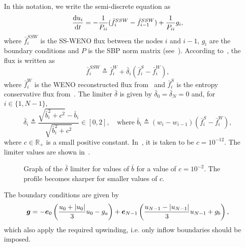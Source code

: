\documentclass{scrartcl}
\begin{document}
In this notation, we write the semi-discrete equation as
\[
\dfrac{\mathrm{d} u_i}{\mathrm{d} t} =
-\frac{1}{P_{ii}} (\bar{f}^{SSW}_i - \bar{f}^{SSW}_{i - 1})
+ \frac{1}{P_{ii}} g_i,
\]
where $\bar{f}^{SSW}_i$ is the SS-WENO flux between the nodes $i$ and $i - 1$,
$g_i$ are the boundary conditions and $P$ is the SBP norm matrix
(see~\cite[Appendix A]{Fisher2013}). According to~\cite{Fisher2013}, the
flux is written as
\begin{equation} \label{eq:ssweno:flux}
\bar{f}_i^{SSW} \triangleq \bar{f}^{W}_i + \bar{\delta}_i (\bar{f}^{S}_i - \bar{f}^W_i),
\end{equation}
where $\bar{f}^W_i$ is the WENO reconstructed flux from~ and
$\bar{f}^S_i$ is the entropy conservative flux from~. The
limiter $\bar{\delta}$ is given by $\bar{\delta}_0 = \bar{\delta}_N = 0$ and,
for $i \in \{1, N - 1\}$,
\begin{equation} \label{eq::ssweno:limiter}
\bar{\delta}_i \triangleq
    \frac{\sqrt{\bar{b}_i^2 + c^2} - \bar{b}_i}{\sqrt{\bar{b}_i^2 + c^2}}
    \in [0, 2],
    \quad \text{where }
    \bar{b}_i \triangleq (w_i - w_{i - 1}) (\bar{f}^S_i - \bar{f}^W_i),
\end{equation}
where $c \in \mathbb{R}_+$ is a small positive constant. In~\cite{Fisher2013},
it is taken to be $c = 10^{-12}$. The limiter values are shown
in~.

\begin{figure}[H]
\centering
{}
\caption{
    Graph of the $\bar{\delta}$ limiter for values of $\bar{b}$
    for a value of $c = 10^{-2}$. The profile becomes sharper for smaller
    values of $c$.}
\label{fig:ssweno:limiter}
\end{figure}

The boundary conditions are given by~\cite[Equation 4.8]{Fisher2013}
\begin{equation} \label{eq:ssweno:bc}
\vect{g} = -\vect{e}_0 \left(
\frac{u_0 + |u_0|}{3} u_0 - g_a
\right) + \vect{e}_{N - 1} \left(
\frac{u_{N - 1} - |u_{N - 1}|}{3} u_{N - 1} + g_b
\right),
\end{equation}
which also apply the required upwinding, i.e. only inflow boundaries should be
imposed.
\end{document}
